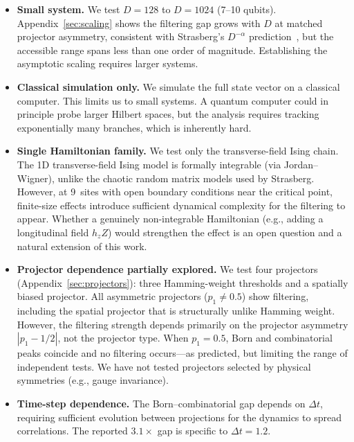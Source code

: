 \documentclass[aps,prd,twocolumn,showpacs,preprintnumbers,amsmath,amssymb,nofootinbib]{revtex4-2}
\begin{document}
\begin{itemize}
  \item \textbf{Small system.} We test $D = 128$ to $D = 1024$ (7--10 qubits).
    Appendix~\ref{sec:scaling} shows the filtering gap grows with $D$ at matched
    projector asymmetry, consistent with Strasberg's $D^{-\alpha}$
    prediction~\cite{Strasberg2024}, but the accessible range spans less than one
    order of magnitude. Establishing the asymptotic scaling requires larger systems.

  \item \textbf{Classical simulation only.} We simulate the full state vector on a
    classical computer. This limits us to small systems. A quantum computer could
    in principle probe larger Hilbert spaces, but the analysis requires tracking
    exponentially many branches, which is inherently hard.

  \item \textbf{Single Hamiltonian family.} We test only the transverse-field Ising
    chain. The 1D transverse-field Ising model is formally integrable (via
    Jordan--Wigner), unlike the chaotic random matrix models used by Strasberg.
    However, at 9~sites with open boundary conditions near the critical point,
    finite-size effects introduce sufficient dynamical complexity for the
    filtering to appear.  Whether a genuinely non-integrable Hamiltonian
    (e.g., adding a longitudinal field $h_z Z$) would strengthen the effect
    is an open question and a natural extension of this work.

  \item \textbf{Projector dependence partially explored.} We test four projectors
    (Appendix~\ref{sec:projectors}): three Hamming-weight thresholds and a
    spatially biased projector. All asymmetric projectors ($p_1 \neq 0.5$)
    show filtering, including the spatial projector that is structurally unlike
    Hamming weight. However, the filtering strength depends primarily on the
    projector asymmetry $|p_1 - 1/2|$, not the projector type.
    When $p_1 = 0.5$, Born and combinatorial peaks coincide and no filtering
    occurs---as predicted, but limiting the range of independent tests.
    We have not tested projectors selected by physical symmetries
    (e.g., gauge invariance).

  \item \textbf{Time-step dependence.} The Born--combinatorial gap depends on
    $\Delta t$, requiring sufficient evolution between projections for the
    dynamics to spread correlations. The reported $3.1\times$ gap is specific to
    $\Delta t = 1.2$.


\end{itemize}
\end{document}
